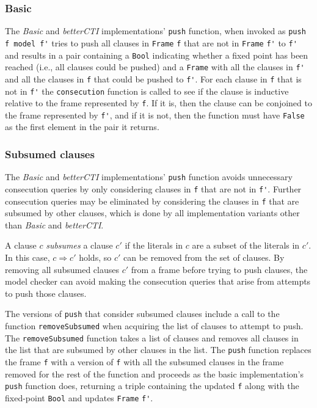 \documentclass[12pt,a4paper,twoside,openright]{report}
\begin{document}
{\subsubsection{Basic}
The {\it Basic} and {\it betterCTI} implementations' \verb,push, function,
when invoked as \verb,push f model f', tries to push all clauses in \verb,Frame, \verb,f,
that are not in \verb,Frame, \verb,f', to \verb,f', and
results in a pair containing a \verb,Bool, indicating whether a fixed point has been reached
(i.e., all clauses could be pushed) and a \verb,Frame, with all the clauses in \verb,f', and all
the clauses in \verb,f, that could be pushed to \verb,f',.
For each clause in \verb,f, that is not in \verb,f', the \verb,consecution, function is called to
see if the clause is inductive relative to the frame represented by \verb,f,. If it is, then
the clause can be conjoined to the frame represented by \verb,f',, and if it is not, then the
function must have \verb,False, as the first element in the pair it returns.

\subsubsection{Subsumed clauses}
The {\it Basic} and {\it betterCTI} implementations' \verb,push, function avoids unnecessary
consecution queries by only considering clauses in \verb,f, that are not in \verb,f',.
Further consecution queries may be eliminated by considering the clauses in \verb,f, that are
subsumed by other clauses, which is done by all implementation variants other than {\it Basic}
and {\it betterCTI}.

A clause $c$ \emph{subsumes} a clause $c'$ if the literals in $c$ are a subset of the literals
in $c'$. In this case, $c \Rightarrow c'$ holds, so $c'$ can be removed from the set of clauses. By
removing all subsumed clauses $c'$ from a frame before trying to push clauses, the model
checker can avoid making the consecution queries that arise from attempts to push those clauses.

The versions of \verb,push, that consider subsumed clauses include a call to the function
\verb,removeSubsumed, when acquiring the list of clauses to attempt to push.
The \verb,removeSubsumed, function takes a list of clauses and removes all clauses in the list
that are subsumed by other clauses in the list. The \verb,push, function replaces the frame
\verb,f, with a version of \verb,f, with all the subsumed clauses in the frame removed for
the rest of the function and proceeds as the basic implementation's \verb,push, function does,
returning a triple containing the updated \verb,f, along with the fixed-point \verb,Bool,
and updates \verb,Frame, \verb,f',.

}
\end{document}
